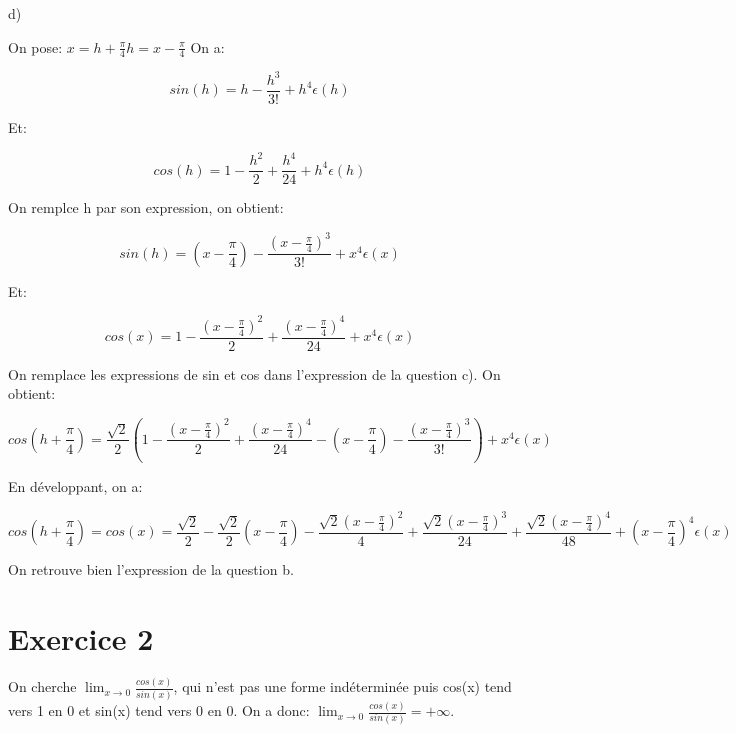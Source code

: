 \documentclass[12pt,a4paper, french]{article}
\begin{document}
d)

On pose: \begin{math}
    x=h+\frac{\pi}{4} h=x-\frac{\pi}{4}
\end{math} 
On a: 
\begin{center}
    \begin{equation*}
       sin(h)=h-\frac{h^3}{3!}+h^4\epsilon(h)
    \end{equation*}
\end{center}
Et:
\begin{center}
    \begin{equation*}
       cos(h)=1-\frac{h^2}{2}+\frac{h^4}{24}+h^4\epsilon(h)
    \end{equation*}
\end{center}

On remplce h par son expression, on obtient:
\begin{center}
    \begin{equation*}
       sin(h)=(x-\frac{\pi}{4})-\frac{(x-\frac{\pi}{4})^3}{3!}+x^4\epsilon(x)
    \end{equation*}
\end{center}
Et:
\begin{center}
    \begin{equation*}
        cos(x)=1-\frac{(x-\frac{\pi}{4})^2}{2}+\frac{(x-\frac{\pi}{4})^4}{24}+x^4\epsilon(x)
    \end{equation*}
\end{center}

On remplace les expressions de sin et cos dans l'expression de la question c). On obtient:
\begin{center}
    \begin{equation*}
        cos(h+\frac{\pi}{4})=\frac{\sqrt{2}}{2}(1-\frac{(x-\frac{\pi}{4})^2}{2}+\frac{(x-\frac{\pi}{4})^4}{24}-(x-\frac{\pi}{4})-\frac{(x-\frac{\pi}{4})^3}{3!})+x^4\epsilon(x)
    \end{equation*}
\end{center}
En développant, on a:
\begin{center}
    \begin{equation*}
        cos(h+\frac{\pi}{4})=cos(x)=\frac{\sqrt{2}}{2}-\frac{\sqrt{2}}{2}(x-\frac{\pi}{4})-\frac{\sqrt{2}(x-\frac{\pi}{4})^2}{4}+\frac{\sqrt{2}(x-\frac{\pi}{4})^3}{24}+\frac{\sqrt{2}(x-\frac{\pi}{4})^4}{48}+(x-\frac{\pi}{4})^4\epsilon(x)
    \end{equation*}
\end{center}    
On retrouve bien l'expression de la question b.
\newpage
\section*{Exercice 2}
 On cherche \begin{math}
    \lim_{x \to 0} \frac{cos(x)}{sin(x)}
 \end{math}, qui n'est pas une forme indéterminée puis cos(x) tend vers 1 en 0 et sin(x) tend vers 0 en 0. On a donc: \begin{math}
    \lim_{x \to 0}\frac{cos(x)}{sin(x)}=+ \infty
 \end{math}.
\end{document}
